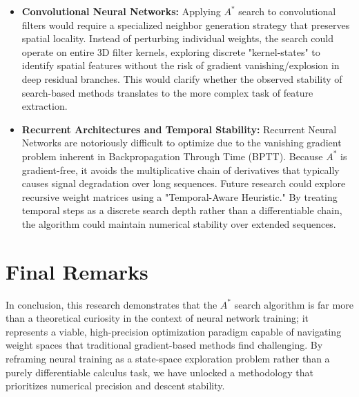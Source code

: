 \begin{itemize}
\begin{itemize}
    \item \textbf{Convolutional Neural Networks:} Applying $A^*$ search to convolutional filters would require a specialized neighbor generation strategy that preserves spatial locality. Instead of perturbing individual weights, the search could operate on entire 3D filter kernels, exploring discrete "kernel-states" to identify spatial features without the risk of gradient vanishing/explosion in deep residual branches. This would clarify whether the observed stability of search-based methods translates to the more complex task of feature extraction.
    \item \textbf{Recurrent Architectures and Temporal Stability:} 
    Recurrent Neural Networks are notoriously difficult to optimize due to the vanishing gradient problem inherent in Backpropagation Through Time (BPTT). Because $A^*$ is gradient-free, it avoids the multiplicative chain of derivatives that typically causes signal degradation over long sequences. 
    Future research could explore recursive weight matrices using a "Temporal-Aware Heuristic." By treating temporal steps as a discrete search depth rather than a differentiable chain, the algorithm could maintain numerical stability over extended sequences.
\end{itemize}

\end{itemize}


\section{Final Remarks}

In conclusion, this research demonstrates that the $A^*$ search algorithm is far more than a theoretical curiosity in the context of neural network training; it represents a viable, high-precision optimization paradigm capable of navigating weight spaces that traditional gradient-based methods find challenging. By reframing neural training as a state-space exploration problem rather than a purely differentiable calculus task, we have unlocked a methodology that prioritizes numerical precision and descent stability.

